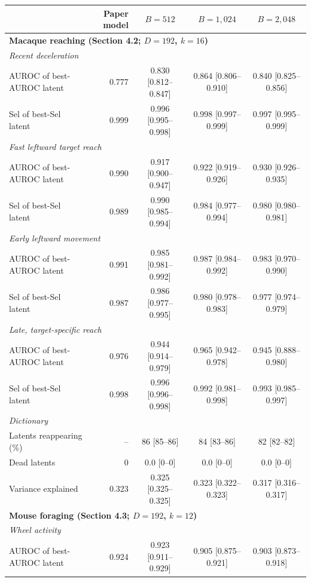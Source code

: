 \begin{tabular*}{\linewidth}{@{\extracolsep{\fill}}lrccc@{}}
\toprule
& Paper model & $B=512$ & $B=1{,}024$ & $B=2{,}048$ \\
\midrule
\multicolumn{5}{l}{\textbf{Macaque reaching (Section 4.2; $D=192$, $k=16$)}} \\
\multicolumn{5}{l}{\textit{Recent deceleration}} \\
\quad AUROC of best-AUROC latent & 0.777 & 0.830 [0.812--0.847] & 0.864 [0.806--0.910] & 0.840 [0.825--0.856] \\
\quad Sel of best-Sel latent & 0.999 & 0.996 [0.995--0.998] & 0.998 [0.997--0.999] & 0.997 [0.995--0.999] \\
\multicolumn{5}{l}{\textit{Fast leftward target reach}} \\
\quad AUROC of best-AUROC latent & 0.990 & 0.917 [0.900--0.947] & 0.922 [0.919--0.926] & 0.930 [0.926--0.935] \\
\quad Sel of best-Sel latent & 0.989 & 0.990 [0.985--0.994] & 0.984 [0.977--0.994] & 0.980 [0.980--0.981] \\
\multicolumn{5}{l}{\textit{Early leftward movement}} \\
\quad AUROC of best-AUROC latent & 0.991 & 0.985 [0.981--0.992] & 0.987 [0.984--0.992] & 0.983 [0.970--0.990] \\
\quad Sel of best-Sel latent & 0.987 & 0.986 [0.977--0.995] & 0.980 [0.978--0.983] & 0.977 [0.974--0.979] \\
\multicolumn{5}{l}{\textit{Late, target-specific reach}} \\
\quad AUROC of best-AUROC latent & 0.976 & 0.944 [0.914--0.979] & 0.965 [0.942--0.978] & 0.945 [0.888--0.980] \\
\quad Sel of best-Sel latent & 0.998 & 0.996 [0.996--0.998] & 0.992 [0.981--0.998] & 0.993 [0.985--0.997] \\
\multicolumn{5}{l}{\textit{Dictionary}} \\
\quad Latents reappearing (\%) & -- & 86 [85--86] & 84 [83--86] & 82 [82--82] \\
\quad Dead latents & 0 & 0.0 [0--0] & 0.0 [0--0] & 0.0 [0--0] \\
\quad Variance explained & 0.323 & 0.325 [0.325--0.325] & 0.323 [0.322--0.323] & 0.317 [0.316--0.317] \\
\midrule
\multicolumn{5}{l}{\textbf{Mouse foraging (Section 4.3; $D=192$, $k=12$)}} \\
\multicolumn{5}{l}{\textit{Wheel activity}} \\
\quad AUROC of best-AUROC latent & 0.924 & 0.923 [0.911--0.929] & 0.905 [0.875--0.921] & 0.903 [0.873--0.918] \\

\end{tabular*}
